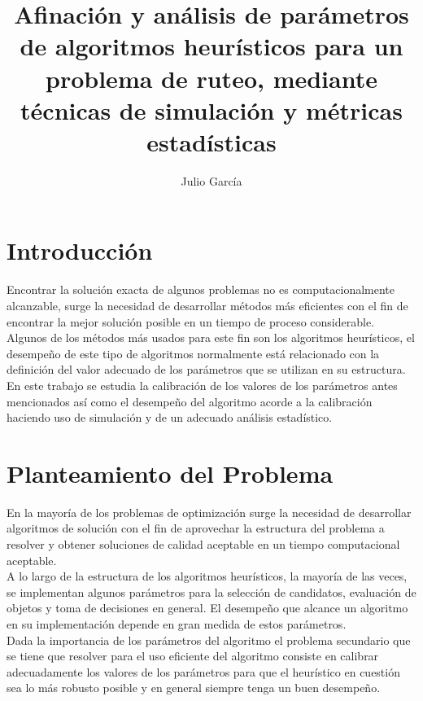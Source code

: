 \documentclass{article}
\title {Afinación y análisis de parámetros de algoritmos heurísticos para un problema de ruteo, mediante técnicas de simulación y métricas estadísticas}
\author{Julio Garc\'ia}
\begin{document}
	\renewcommand{\listtablename}{Índice de tablas}
	\renewcommand{\tablename}{Cuadro}
	\maketitle

	\section{Introducción}

Encontrar la solución exacta de algunos problemas no es computacionalmente alcanzable, surge la necesidad de desarrollar métodos más eficientes con el fin de encontrar la mejor solución posible en un tiempo de proceso considerable.\\

Algunos de los métodos más usados para este fin son los algoritmos heurísticos, el desempeño de este tipo de algoritmos normalmente está relacionado con la definición del valor adecuado de los parámetros que se utilizan en su estructura.\\

En este trabajo se estudia la calibración de los valores de los parámetros antes mencionados  así como el desempeño del algoritmo acorde a la calibración haciendo uso de simulación y de un adecuado análisis estadístico.\\

\section{Planteamiento del Problema}

En la mayoría de los problemas de optimización surge la necesidad de desarrollar algoritmos de solución con el fin de aprovechar la estructura del problema a resolver y obtener soluciones de calidad aceptable en un tiempo computacional aceptable. \\

A lo largo de la estructura de los algoritmos heurísticos, la mayoría de las veces, se implementan algunos parámetros para la selección de candidatos, evaluación de objetos y toma de decisiones en general. El desempeño que alcance un algoritmo en su implementación depende en gran medida de estos parámetros.\\

Dada la importancia de los parámetros del algoritmo el problema secundario que se tiene que resolver para el uso eficiente del algoritmo consiste en calibrar adecuadamente los valores de los parámetros para que el heurístico en cuestión sea lo más robusto posible y en general siempre tenga un buen desempeño.\\
\end{document}
